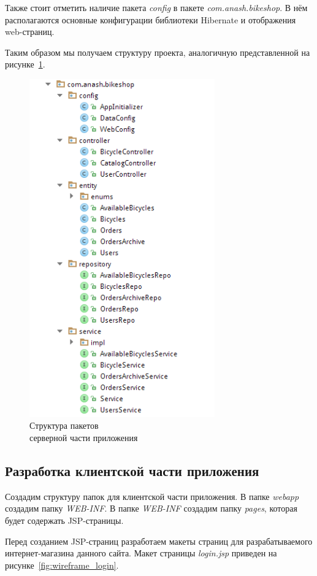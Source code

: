 Также стоит отметить наличие пакета \textit{config} в пакете \textit{com.anash.bikeshop}.
В нём располагаются основные конфигурации библиотеки Hibernate и отображения web-страниц.

Таким образом мы получаем структуру проекта, аналогичную представленной
на рисунке~\ref{fig:project_structure}.

\begin{figure}[h]
  \centering
  \includegraphics[width=80mm]{pic/project_structure.png}
  \caption{Структура пакетов \\ серверной части приложения}
  \label{fig:project_structure}
\end{figure}

\subsection{Разработка клиентской части приложения}

Создадим структуру папок для клиентской части приложения. В папке \textit{webapp}
создадим папку \textit{WEB-INF}. В папке \textit{WEB-INF} создадим папку
\textit{pages}, которая будет содержать JSP-страницы.

Перед созданием JSP-страниц разработаем макеты страниц для разрабатываемого
интернет-магазина данного сайта. Макет страницы \textit{login.jsp}
приведен на рисунке~\ref{fig:wireframe_login}.

